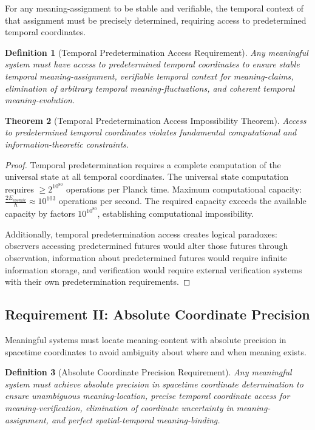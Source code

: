 \documentclass[12pt,a4paper]{article}
\newtheorem{theorem}{Theorem}[section]
\newtheorem{definition}[theorem]{Definition}
\begin{document}
For any meaning-assignment to be stable and verifiable, the temporal context of that assignment must be precisely determined, requiring access to predetermined temporal coordinates.

\begin{definition}[Temporal Predetermination Access Requirement]
Any meaningful system must have access to predetermined temporal coordinates to ensure stable temporal meaning-assignment, verifiable temporal context for meaning-claims, elimination of arbitrary temporal meaning-fluctuations, and coherent temporal meaning-evolution.
\end{definition}

\begin{theorem}[Temporal Predetermination Access Impossibility Theorem]
Access to predetermined temporal coordinates violates fundamental computational and information-theoretic constraints.
\end{theorem}

\begin{proof}
Temporal predetermination requires a complete computation of the universal state at all temporal coordinates. The universal state computation requires $\geq 2^{10^{80}}$ operations per Planck time. Maximum computational capacity: $\frac{2E_{cosmic}}{\hbar} \approx 10^{103}$ operations per second. The required capacity exceeds the available capacity by factors $10^{10^{80}}$, establishing computational impossibility.

Additionally, temporal predetermination access creates logical paradoxes: observers accessing predetermined futures would alter those futures through observation, information about predetermined futures would require infinite information storage, and verification would require external verification systems with their own predetermination requirements.
\end{proof}

\subsection{Requirement II: Absolute Coordinate Precision}

Meaningful systems must locate meaning-content with absolute precision in spacetime coordinates to avoid ambiguity about where and when meaning exists.

\begin{definition}[Absolute Coordinate Precision Requirement]
Any meaningful system must achieve absolute precision in spacetime coordinate determination to ensure unambiguous meaning-location, precise temporal coordinate access for meaning-verification, elimination of coordinate uncertainty in meaning-assignment, and perfect spatial-temporal meaning-binding.
\end{definition}
\end{document}
